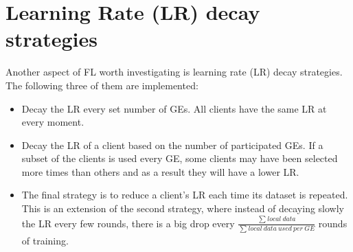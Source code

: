 \section{Learning Rate (LR) decay strategies}
Another aspect of FL worth investigating is learning rate (LR) decay strategies. The following three of them are implemented:
\begin{itemize}
    \item Decay the LR every set number of GEs. All clients have the same LR at every moment.
    \item Decay the LR of a client based on the number of participated GEs. If a subset of the clients is used every GE, some clients may have been selected more times than others and as a result they will have a lower LR.
    \item The final strategy is to reduce a client's LR each time its dataset is repeated. This is an extension of the second strategy, where instead of decaying slowly the LR every few rounds, there is a big drop every \( \displaystyle \frac{\sum_{}^{}local\ data}{\sum_{}^{} local\ data\ used\ per\ GE} \) rounds of training.
\end{itemize}
\begin{table}[H]
    \center
    \caption[Experiment 7 parameters]{Experiment 7 parameters}
    \label{table:Experiment 7 parameters}
\end{table}
